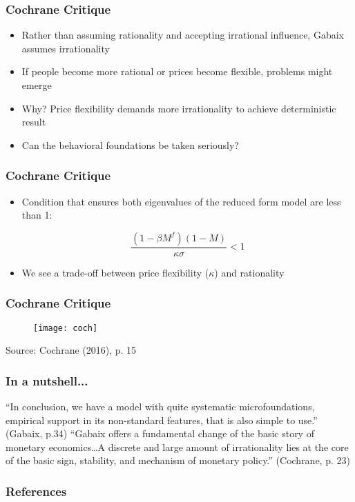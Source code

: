 \documentclass{beamer}
\begin{document}

\begin{frame}
	\frametitle{Cochrane Critique}
	\begin{itemize}
		\item Rather than assuming rationality and accepting irrational influence, Gabaix assumes irrationality 
		\item If people become more rational or prices become flexible, problems might emerge
		\item Why? Price flexibility demands more irrationality to achieve deterministic result
		\item Can the behavioral foundations be taken seriously?
	\end{itemize}
\end{frame}


\begin{frame}
	\frametitle{Cochrane Critique}
	\begin{itemize}
		\item Condition that ensures both eigenvalues of the reduced form model are less than 1:
		\begin{center}
			$$\frac{(1 - \beta M^{f})(1 - M)}{\kappa\sigma} < 1$$
		\end{center}
		\vspace{8pt}
		\item We see a trade-off between price flexibility ($\kappa$) and rationality
	\end{itemize}
\end{frame}


\begin{frame}
	\frametitle{Cochrane Critique}
	\begin{figure}[h]
		\texttt{[image: coch]}
	\end{figure}
	{\footnotesize Source: Cochrane (2016), p. 15}
\end{frame}


\begin{frame}
	\frametitle{In a nutshell...}
	\begin{center}
		``In conclusion, we have a model with quite systematic microfoundations, empirical support in its non-standard features, that is also simple to use.'' (Gabaix, p.34)
		\vspace{10pt}
		``Gabaix offers a fundamental change of the basic story of monetary economics…A discrete and large amount of irrationality lies at the core of the basic sign, stability, and mechanism of monetary policy.'' (Cochrane, p. 23)
	\end{center}
\end{frame}


\begin{frame}
	\frametitle{References}
\end{frame}

\end{document}
